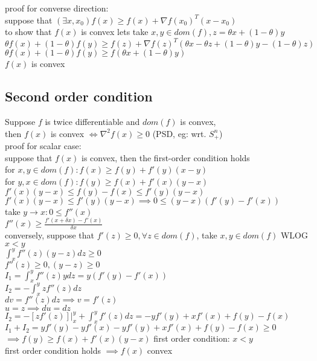 \message{ !name(notebook.tex)}\documentclass[8pt]{report}
\begin{document}
\begin{multicols*}{2}
  proof for converse direction:\\
  suppose that $(\exists x, x_0) f(x) \geq f(x) + \nabla f(x_0)^T(x-x_0)$\\
  to show that $f(x)$ is convex lets take $x,y \in dom(f), z= \theta x + (1-\theta)y$\\
  $\theta f(x) + (1-\theta) f(y) \geq f(z) + \nabla f(z)^T(\theta x - \theta z + (1-\theta)y - (1-\theta)z)$\\
  $\theta f(x) + (1-\theta) f(y) \geq f(\theta x +(1-\theta)y)$\\
  $f(x)$ is convex
  \subsection{Second order condition}
  Suppose $f$ is twice differentiable and $dom(f)$ is convex, \\
  then $f(x)$ is convex $\iff \nabla^2 f(x) \geq 0 $ (PSD, eg: wrt. $S_+^n$)\\
  
  proof for scalar case:\\
  suppose that $f(x)$ is convex, then the first-order condition holds\\
  for $x,y \in dom(f): f(x) \geq f(y) + f'(y)(x-y)$\\
  for $y,x \in dom(f): f(y) \geq f(x) + f'(x)(y-x)$\\
  $f'(x)(y-x) \leq f(y)-f(x) \leq f'(y)(y-x)$\\
  $f'(x)(y-x) \leq f'(y)(y-x) \implies 0 \leq (y-x)(f'(y)-f'(x))$\\
  take $y\to x: 0 \leq f''(x)$\\
  $f''(x) \geq \frac{f'(x+\delta x)-f'(x)}{\delta x}$\\

  conversely, suppose that $f'(z) \geq 0, \forall z \in dom(f)$, take $x,y \in dom(f)$ WLOG $x < y$\\
  $\int_x^y f''(z)(y-z) dz \geq 0$\\
  $f''(z) \geq 0, (y-z) \geq 0$\\
  $I_1 = \int_x^y f''(z)y dz =  y(f'(y)-f'(x))$\\
  $I_2 = -\int_x^y zf''(z) dz$\\
  $dv=f''(z) dz \implies v = f'(z)$\\
  $u=z\implies du = dz$\\
  $I_2 = -[z f'(z)]|_x^y + \int_x^y f'(z) dz = -y f'(y) + x f'(x)+f(y)-f(x)$\\
  $I_1+I_2=y f'(y)-y f'(x)-y f'(y) + x f'(x) + f(y)-f(x) \geq 0$\\
  $\implies f(y) \geq f(x) + f'(x)(y-x)$ first order condition: $x<y$\\
  first order condition holds $\implies f(x)$ convex\\


\end{multicols*}
\end{document}
